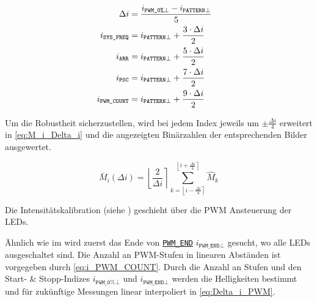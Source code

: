 \begin{align}
  \phantom{i_{\texttt{PWM\_COUNT}} } %
    &\begin{aligned}\label{eq:Delta_i}
    \mathllap{ \Delta i} &= \frac{i_{\texttt{PWM\_0\%}\bot} - i_{\texttt{PATTERN}\bot}}{5}
  \end{aligned}\\
    &\begin{aligned}\label{eq:i_SYS_FREQ}
    \mathllap{ i_{\texttt{SYS\_FREQ}} } &= i_{\texttt{PATTERN}\bot} + \frac{3 \cdot \Delta i}{2}
  \end{aligned}\\
  &\begin{aligned}
    \mathllap{ i_{\texttt{ARR}} } &= i_{\texttt{PATTERN}\bot} + \frac{5 \cdot \Delta i}{2}
  \end{aligned}\\
  &\begin{aligned}
    \mathllap{ i_{\texttt{PSC}} } &= i_{\texttt{PATTERN}\bot} + \frac{7 \cdot \Delta i}{2}
  \end{aligned}\\
  &\begin{aligned}\label{eq:i_PWM_COUNT}
    \mathllap{ i_{\texttt{PWM\_COUNT}} } &= i_{\texttt{PATTERN}\bot} + \frac{9 \cdot \Delta i}{2}
  \end{aligned}
\end{align}

Um die Robustheit sicherzustellen, wird bei jedem Index jeweils um $\pm \frac{\Delta i}{4}$ erweitert in \eqref{eq:M_i_Delta_i} und die angezeigten Binärzahlen der entsprechenden Bilder ausgewertet.

\begin{equation}\label{eq:M_i_Delta_i}
  \bar{M}_i(\Delta i) = \left\lfloor \frac{2}{\Delta i} \right\rceil \sum_{ k=\left\lfloor i-\frac{\Delta i}{4} \right\rceil }^{ \left\lfloor i+\frac{\Delta i}{4} \right\rceil } \widehat{M}_{k}
\end{equation}



Die Intensitätskalibration (siehe ) geschieht über die PWM Ansteuerung der LEDs.

Ähnlich wie im  wird zuerst das Ende von \hyperlink{order:step9}{\texttt{PWM\_END}} $i_{\texttt{PWM\_END}\bot}$ gesucht, wo alle LEDs ausgeschaltet sind.
Die Anzahl an PWM-Stufen in linearen Abständen ist vorgegeben durch \eqref{eq:i_PWM_COUNT}.
Durch die Anzahl an Stufen und den Start- \& Stopp-Indizes $i_{\texttt{PWM\_0\%}\bot}$ und $i_{\texttt{PWM\_END}\bot}$ werden die Helligkeiten bestimmt und für zukünftige Messungen linear interpoliert
in \eqref{eq:Delta_i_PWM}.

